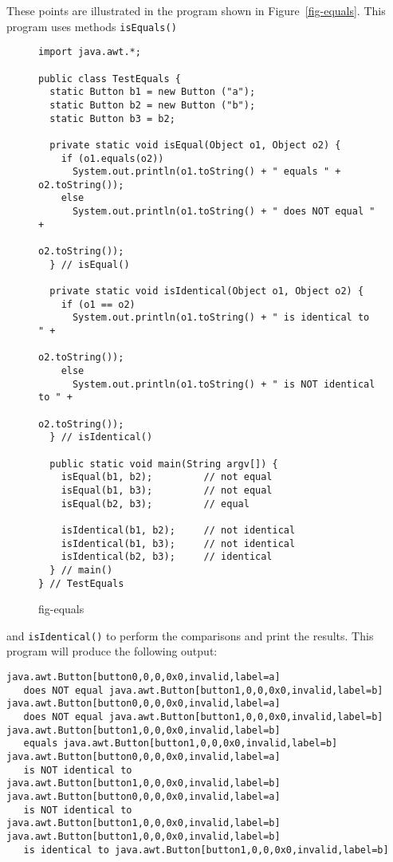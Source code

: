 These points are illustrated in the program shown in
Figure~\ref{fig-equals}. This program uses methods {\tt isEquals()}
\begin{figure}[h!]
\jjjprogstart
\begin{jjjlisting}[32pc]
\begin{lstlisting}
import java.awt.*;

public class TestEquals {
  static Button b1 = new Button ("a");
  static Button b2 = new Button ("b");
  static Button b3 = b2;

  private static void isEqual(Object o1, Object o2) {
    if (o1.equals(o2))
      System.out.println(o1.toString() + " equals " + o2.toString());
    else
      System.out.println(o1.toString() + " does NOT equal " + 
                                                      o2.toString());
  } // isEqual()

  private static void isIdentical(Object o1, Object o2) {
    if (o1 == o2)
      System.out.println(o1.toString() + " is identical to " + 
                                                      o2.toString());
    else
      System.out.println(o1.toString() + " is NOT identical to " + 
                                                      o2.toString());
  } // isIdentical()

  public static void main(String argv[]) {
    isEqual(b1, b2);         // not equal
    isEqual(b1, b3);         // not equal
    isEqual(b2, b3);         // equal

    isIdentical(b1, b2);     // not identical
    isIdentical(b1, b3);     // not identical
    isIdentical(b2, b3);     // identical
  } // main()
} // TestEquals
\end{lstlisting}
\end{jjjlisting}
{fig-equals}
\end{figure}
and {\tt isIdentical()} to perform the comparisons and print the
results. This program will produce the following output:

\begin{jjjlisting}[32pc]
\begin{lstlisting}
java.awt.Button[button0,0,0,0x0,invalid,label=a]
   does NOT equal java.awt.Button[button1,0,0,0x0,invalid,label=b]
java.awt.Button[button0,0,0,0x0,invalid,label=a]
   does NOT equal java.awt.Button[button1,0,0,0x0,invalid,label=b]
java.awt.Button[button1,0,0,0x0,invalid,label=b]
   equals java.awt.Button[button1,0,0,0x0,invalid,label=b]
java.awt.Button[button0,0,0,0x0,invalid,label=a]
   is NOT identical to java.awt.Button[button1,0,0,0x0,invalid,label=b]
java.awt.Button[button0,0,0,0x0,invalid,label=a]
   is NOT identical to java.awt.Button[button1,0,0,0x0,invalid,label=b]
java.awt.Button[button1,0,0,0x0,invalid,label=b]
   is identical to java.awt.Button[button1,0,0,0x0,invalid,label=b]
\end{lstlisting}
\end{jjjlisting}



